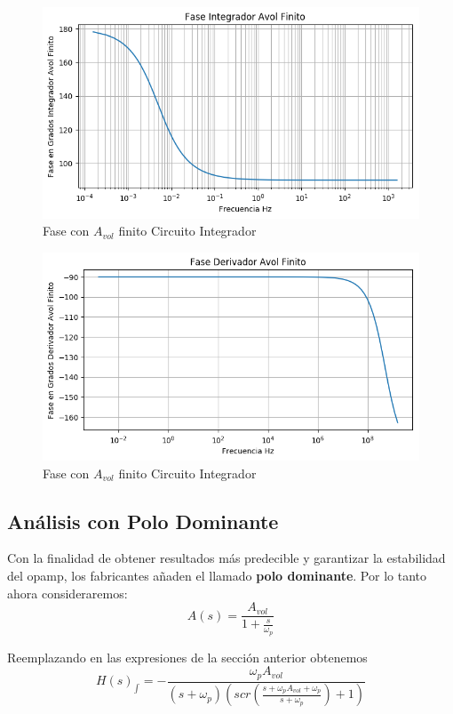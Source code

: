 \begin{figure}[H]
	\centering
	\includegraphics[width=\textwidth]{Ejercicio4/BODE-AVOL-FINITO-FASE-INTEGRADOR}
	\caption{Fase con $A_{vol}$ finito Circuito Integrador}
\end{figure}

\begin{figure}[H]
	\centering
	\includegraphics[width=\textwidth]{Ejercicio4/BODE-AVOL-FINITO-FASE-DERIVADOR}
	\caption{Fase con $A_{vol}$ finito Circuito Integrador}
\end{figure}

\subsection{Análisis con Polo Dominante}
Con la finalidad de obtener resultados más predecible y garantizar la estabilidad del opamp, los fabricantes añaden el llamado \textbf{polo dominante}.
Por lo tanto ahora consideraremos:
$$A(s)=\frac{A_{vol}}{1+\frac{s}{\omega_p}}$$

Reemplazando en las expresiones de la sección anterior obtenemos
$$H(s)_{\int}=- \frac{\omega_p A_{vol}}{\left(s + \omega_p\right) \left(s c r{\left (\frac{s + \omega_p A_{vol} + \omega_p}{s + \omega_p} \right )} + 1\right)}$$


